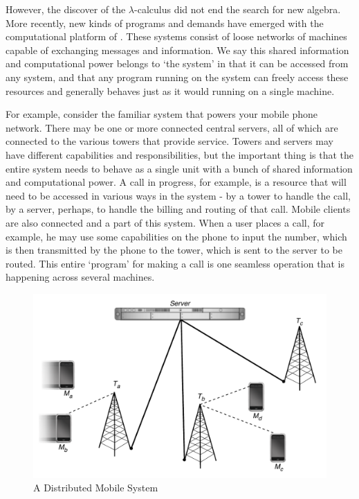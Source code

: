However, the discover of the $\lambda$-calculus did not end the search for new algebra.  More recently, new kinds of programs and demands have emerged with the computational platform of .  These systems consist of loose networks of machines capable of exchanging messages and information.  We say this shared information and computational power belongs to `the system' in that it can be accessed from any system, and that any program running on the system can freely access these resources and generally behaves just as it would running on a single machine.

For example, consider the familiar system that powers your mobile phone network.  There may be one or more connected central servers, all of which are connected to the various towers that provide service.  Towers and servers may have different capabilities and responsibilities, but the important thing is that the entire system needs to behave as a single unit with a bunch of shared information and computational power.  A call in progress, for example, is a resource that will need to be accessed in various ways in the system - by a tower to handle the call, by a server, perhaps, to handle the billing and routing of that call.  Mobile clients are also connected and a part of this system.  When a user places a call, for example, he may use some capabilities on the phone to input the number, which is then transmitted by the phone to the tower, which is sent to the server to be routed.  This entire `program' for making a call is one seamless operation that is happening across several machines.  

\begin{figure}[H]
\centering
\includegraphics[scale=0.7]{figures/cell_network.pdf} %
\caption{A Distributed Mobile System}
\label{fig_cell_network}
\end{figure}


